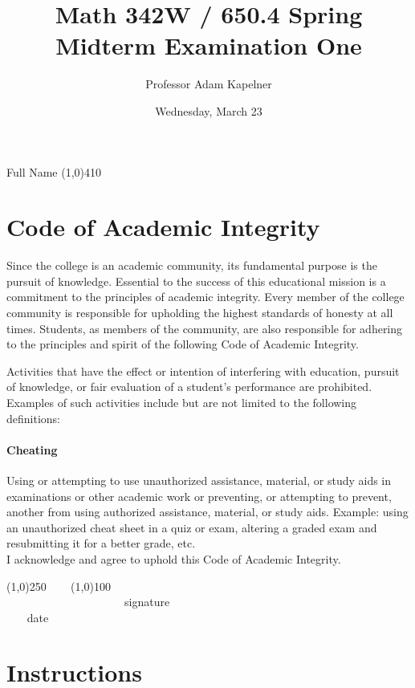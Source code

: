 \documentclass[12pt]{article}
\title{Math 342W / 650.4 Spring \the\year \\ Midterm Examination One}
\author{Professor Adam Kapelner}
\date{Wednesday, March 23}
\begin{document}
\maketitle

\noindent Full Name \line(1,0){410}

\thispagestyle{empty}

\section*{Code of Academic Integrity}

\footnotesize
Since the college is an academic community, its fundamental purpose is the pursuit of knowledge. Essential to the success of this educational mission is a commitment to the principles of academic integrity. Every member of the college community is responsible for upholding the highest standards of honesty at all times. Students, as members of the community, are also responsible for adhering to the principles and spirit of the following Code of Academic Integrity.

Activities that have the effect or intention of interfering with education, pursuit of knowledge, or fair evaluation of a student's performance are prohibited. Examples of such activities include but are not limited to the following definitions:

\paragraph{Cheating} Using or attempting to use unauthorized assistance, material, or study aids in examinations or other academic work or preventing, or attempting to prevent, another from using authorized assistance, material, or study aids. Example: using an unauthorized cheat sheet in a quiz or exam, altering a graded exam and resubmitting it for a better grade, etc.
\\

\noindent I acknowledge and agree to uphold this Code of Academic Integrity. \\

\begin{center}
\line(1,0){250} ~~~ \line(1,0){100}\\
~~~~~~~~~~~~~~~~~~~~~signature~~~~~~~~~~~~~~~~~~~~~~~~~~~~~~~~~~~~~~~~~~~~~ date
\end{center}

\normalsize

\section*{Instructions}
\end{document}
